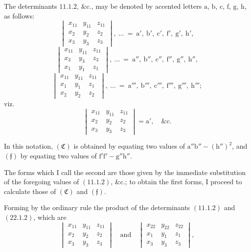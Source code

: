 \documentclass[11pt,a4paper]{article}
\begin{document}
\medskip
The determinants $11.1.2$, \&c., may be denoted by accented letters $\text{a}$, $\text{b}$, $\text{c}$, $\text{f}$, $\text{g}$, $\text{h}$, as follows:
\[
\begin{vmatrix}
x_{11} & y_{11} & z_{11}\\
x_{2}  & y_{2}  & z_{2}\\
x_{3}  & y_{3}  & z_{3}
\end{vmatrix},\ \ldots\ =\ \text{a}',\ \text{b}',\ \text{c}',\ \text{f}',\ \text{g}',\ \text{h}',
\]
\[
\begin{vmatrix}
x_{11} & y_{11} & z_{11}\\
x_{3}  & y_{3}  & z_{3}\\
x_{1}  & y_{1}  & z_{1}
\end{vmatrix},\ \ldots\ =\ \text{a}'',\ \text{b}'',\ \text{c}'',\ \text{f}'',\ \text{g}'',\ \text{h}'',
\]
\[
\begin{vmatrix}
x_{11} & y_{11} & z_{11}\\
x_{1}  & y_{1}  & z_{1}\\
x_{2}  & y_{2}  & z_{2}
\end{vmatrix},\ \ldots\ =\ \text{a}''',\ \text{b}''',\ \text{c}''',\ \text{f}''',\ \text{g}''',\ \text{h}''';
\]
viz.
\[
\begin{vmatrix}
x_{11} & y_{11} & z_{11}\\
x_{2}  & y_{2}  & z_{2}\\
x_{3}  & y_{3}  & z_{3}
\end{vmatrix} = \text{a}',\quad \&\text{c}.
\]

In this notation, $(\mathfrak{C})$ is obtained by equating two values of $\text{a}''\text{b}'' - (\text{h}'')^{2}$, and $(\mathfrak{f})$ by equating two values of $\text{f}'\text{f}' - \text{g}''\text{h}''$.

\medskip
The forms which I call the second are those given by the immediate substitution of the foregoing values of $(11.1.2)$, \&c.; to obtain the first forms, I proceed to calculate those of $(\mathfrak{C})$ and $(\mathfrak{f})$.

\medskip
Forming by the ordinary rule the product of the determinants $(11.1.2)$ and $(22.1.2)$, which are
\[
\begin{vmatrix} x_{11} & y_{11} & z_{11}\\ x_{2} & y_{2} & z_{2}\\ x_{3} & y_{3} & z_{3} \end{vmatrix}\quad\text{and}\quad
\begin{vmatrix} x_{22} & y_{22} & z_{22}\\ x_{1} & y_{1} & z_{1}\\ x_{3} & y_{3} & z_{3} \end{vmatrix},
\]
\clearpage
\end{document}

